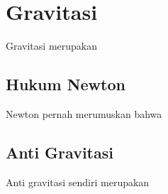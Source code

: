 \section{Gravitasi}
\vspace{1ex}

Gravitasi merupakan \lipsum[1]
\vspace{0.5ex}

\subsection{Hukum Newton}
\vspace{1ex}

Newton pernah merumuskan bahwa \lipsum[2]
\vspace{0.5ex}

\subsection{Anti Gravitasi}
\vspace{1ex}

Anti gravitasi sendiri merupakan \lipsum[3]
\vspace{0.5ex}